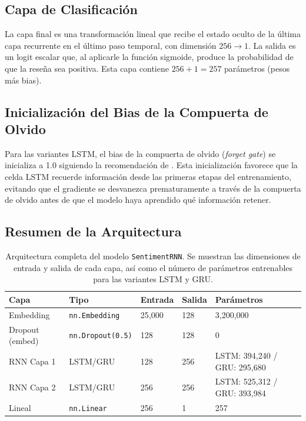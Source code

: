 \subsection{Capa de Clasificación}

La capa final es una transformación lineal que recibe el estado oculto de la última
capa recurrente en el último paso temporal, con dimensión $256 \to 1$. La salida
es un logit escalar que, al aplicarle la función sigmoide, produce la probabilidad
de que la reseña sea positiva. Esta capa contiene $256 + 1 = 257$ parámetros
(pesos más bias).

\subsection{Inicialización del Bias de la Compuerta de Olvido}

Para las variantes LSTM, el bias de la compuerta de olvido (\textit{forget gate})
se inicializa a 1.0 siguiendo la recomendación de \cite{jozefowicz2015}. Esta
inicialización favorece que la celda LSTM recuerde información desde las primeras
etapas del entrenamiento, evitando que el gradiente se desvanezca prematuramente
a través de la compuerta de olvido antes de que el modelo haya aprendido qué
información retener.


\subsection{Resumen de la Arquitectura}

\begin{table}[H]
\centering
\caption{Arquitectura completa del modelo \texttt{SentimentRNN}. Se muestran las
dimensiones de entrada y salida de cada capa, así como el número de parámetros
entrenables para las variantes LSTM y GRU.}
\label{tab:arquitectura}
\begin{tabular}{lllll}
\toprule
\textbf{Capa} & \textbf{Tipo} & \textbf{Entrada} & \textbf{Salida} & \textbf{Parámetros} \\
\midrule
Embedding       & \texttt{nn.Embedding}    & 25,000 & 128 & 3,200,000 \\
Dropout (embed) & \texttt{nn.Dropout(0.5)} & 128    & 128 & 0 \\
RNN Capa 1      & LSTM/GRU                 & 128    & 256 & LSTM: 394,240 / GRU: 295,680 \\
RNN Capa 2      & LSTM/GRU                 & 256    & 256 & LSTM: 525,312 / GRU: 393,984 \\
Lineal          & \texttt{nn.Linear}       & 256    & 1   & 257 \\
\bottomrule
\end{tabular}
\end{table}

